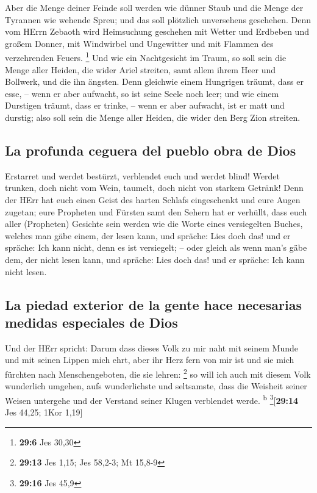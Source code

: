  Aber die Menge deiner Feinde soll werden wie dünner Staub
und die Menge der Tyrannen wie wehende Spreu; und das soll plötzlich
unversehens geschehen.  Denn vom HErrn Zebaoth wird
Heimsuchung geschehen mit Wetter und Erdbeben und großem Donner, mit
Windwirbel und Ungewitter und mit Flammen des verzehrenden Feuers.
\footnote{\textbf{29:6} Jes 30,30}  Und wie ein
Nachtgesicht im Traum, so soll sein die Menge aller Heiden, die wider
Ariel streiten, samt allem ihrem Heer und Bollwerk, und die ihn ängsten.
 Denn gleichwie einem Hungrigen träumt, dass er esse, --
wenn er aber aufwacht, so ist seine Seele noch leer; und wie einem
Durstigen träumt, dass er trinke, -- wenn er aber aufwacht, ist er matt
und durstig; also soll sein die Menge aller Heiden, die wider den Berg
Zion streiten.

\hypertarget{la-profunda-ceguera-del-pueblo-obra-de-dios}{%
\subsection{La profunda ceguera del pueblo obra de
Dios}\label{la-profunda-ceguera-del-pueblo-obra-de-dios}}

 Erstarret und werdet bestürzt, verblendet euch und werdet
blind! Werdet trunken, doch nicht vom Wein, taumelt, doch nicht von
starkem Getränk!  Denn der HErr hat euch einen Geist des
harten Schlafs eingeschenkt und eure Augen zugetan; eure Propheten und
Fürsten samt den Sehern hat er verhüllt,  dass euch aller
(Propheten) Gesichte sein werden wie die Worte eines versiegelten
Buches, welches man gäbe einem, der lesen kann, und spräche: Lies doch
das! und er spräche: Ich kann nicht, denn es ist versiegelt; --
 oder gleich als wenn man's gäbe dem, der nicht lesen
kann, und spräche: Lies doch das! und er spräche: Ich kann nicht lesen.

\hypertarget{la-piedad-exterior-de-la-gente-hace-necesarias-medidas-especiales-de-dios}{%
\subsection{La piedad exterior de la gente hace necesarias medidas
especiales de
Dios}\label{la-piedad-exterior-de-la-gente-hace-necesarias-medidas-especiales-de-dios}}

 Und der HErr spricht: Darum dass dieses Volk zu mir naht
mit seinem Munde und mit seinen Lippen mich ehrt, aber ihr Herz fern von
mir ist und sie mich fürchten nach Menschengeboten, die sie lehren:
\footnote{\textbf{29:13} Jes 1,15; Jes 58,2-3; Mt 15,8-9}
 so will ich auch mit diesem Volk wunderlich umgehen,
aufs wunderlichste und seltsamste, dass die Weisheit seiner Weisen
untergehe und der Verstand seiner Klugen verblendet werde.
\textsuperscript{b} \footnote{\textbf{29:16} Jes 45,9}{[}\textbf{29:14}
Jes 44,25; 1Kor 1,19{]}


